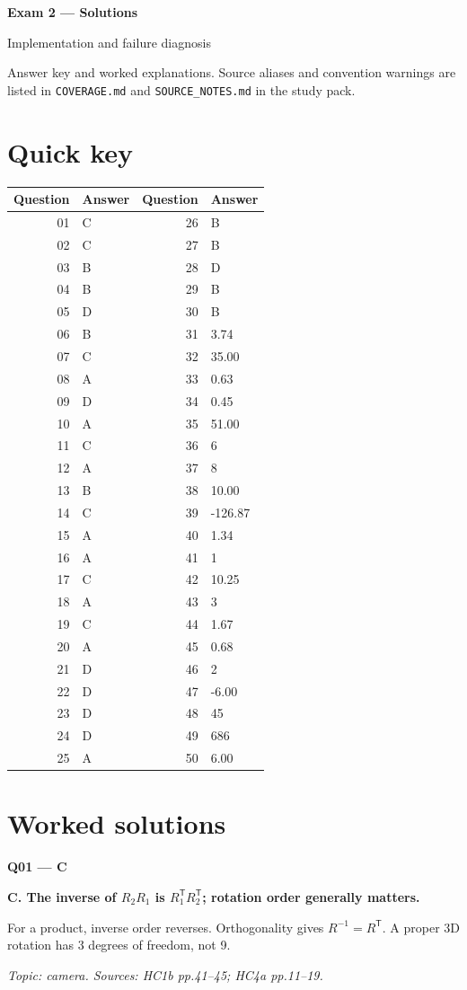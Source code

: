 \documentclass[11pt,a4paper]{article}
\begin{document}
{\LARGE\bfseries Exam 2 — Solutions}\par
{\large Implementation and failure diagnosis}\par\bigskip
Answer key and worked explanations. Source aliases and convention warnings are listed in \texttt{COVERAGE.md} and \texttt{SOURCE\_NOTES.md} in the study pack.
\section*{Quick key}
\begin{longtable}{@{}r l@{\hspace{25mm}}r l@{}}
\toprule Question & Answer & Question & Answer \\ \midrule
01 & C & 26 & B \\
02 & C & 27 & B \\
03 & B & 28 & D \\
04 & B & 29 & B \\
05 & D & 30 & B \\
06 & B & 31 & 3.74 \\
07 & C & 32 & 35.00 \\
08 & A & 33 & 0.63 \\
09 & D & 34 & 0.45 \\
10 & A & 35 & 51.00 \\
11 & C & 36 & 6 \\
12 & A & 37 & 8 \\
13 & B & 38 & 10.00 \\
14 & C & 39 & -126.87 \\
15 & A & 40 & 1.34 \\
16 & A & 41 & 1 \\
17 & C & 42 & 10.25 \\
18 & A & 43 & 3 \\
19 & C & 44 & 1.67 \\
20 & A & 45 & 0.68 \\
21 & D & 46 & 2 \\
22 & D & 47 & -6.00 \\
23 & D & 48 & 45 \\
24 & D & 49 & 686 \\
25 & A & 50 & 6.00 \\
\bottomrule\end{longtable}
\clearpage\section*{Worked solutions}
\begin{minipage}{\linewidth}
\textbf{Q01 — C}\par\smallskip
\textbf{C. The inverse of \(R_2 R_1\) is \(R_1^{\mathsf T}R_2^{\mathsf T}\); rotation order generally matters.}\par
For a product,\allowbreak{} inverse order reverses. Orthogonality gives \(R^{-1}=R^{\mathsf T}\). A proper 3D rotation has 3 degrees of freedom,\allowbreak{} not 9.\par
{\small\itshape Topic: camera. Sources: HC1b pp.41–45; HC4a pp.11–19.}

\end{minipage}
\end{document}
